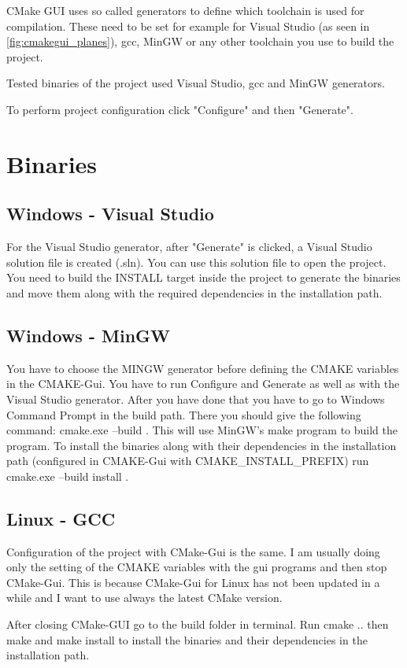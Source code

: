 CMake GUI uses so called generators to define which toolchain is used for compilation. These need to be set for example for Visual Studio (as seen in \ref{fig:cmakegui_planes}), gcc, MinGW or any other toolchain you use to build the project.

Tested binaries of the project used Visual Studio, gcc and MinGW generators.

To perform project configuration click "Configure" and then "Generate".

\section {Binaries}

\subsection{Windows - Visual Studio}

For the Visual Studio generator, after "Generate" is clicked, a Visual Studio solution file is created (.sln). You can use this solution file to open the project. You need to build the INSTALL target inside the project to generate the binaries and move them along with the required dependencies in the installation path. 

\subsection {Windows - MinGW} 

You have to choose the MINGW generator before defining the CMAKE variables in the CMAKE-Gui. You have to run Configure and Generate as well as with the Visual Studio generator. After you have done that you have to go to Windows Command Prompt in the build path. There you should give the following command: cmake.exe --build . This will use MinGW's make program to build the program. To install the binaries along with their dependencies in the installation path (configured in CMAKE-Gui with CMAKE\_INSTALL\_PREFIX) run cmake.exe --build install .

\subsection {Linux - GCC}

Configuration of the project with CMake-Gui is the same. I am usually doing only the setting of the CMAKE variables with the gui programs and then stop CMake-Gui. This is because CMake-Gui for Linux has not been updated in a while and I want to use always the latest CMake version. 

After closing CMake-GUI go to the build folder in terminal. Run cmake .. then make and make install to install the binaries and their dependencies in the installation path.